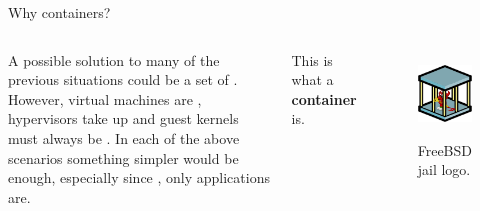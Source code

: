 \begin{frame}{Why containers?}
	\begin{columns}
		A possible solution to many of the previous situations could be a set of .\\
		However, virtual machines are , hypervisors take up  and guest kernels must always be .
		\newline\newline
		In each of the above scenarios something simpler would be enough, especially since , only applications are.
		\begin{block}{}
			\centering
			This is what a \textbf{container} is.
		\end{block}

		\begin{figure}
			\centering
			\includegraphics[scale=.7]{freebsdjail.png}
			\label{fig:jail}
			\caption{FreeBSD jail logo.}
		\end{figure}
	\end{columns}
\end{frame}


